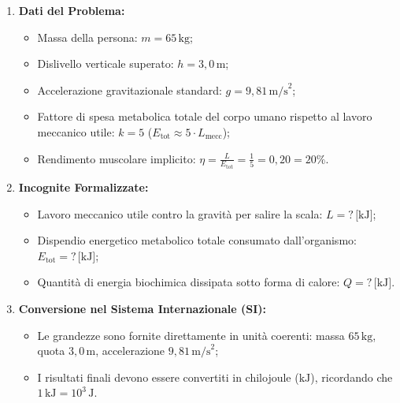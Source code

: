 \documentclass[11pt,a4paper,oneside]{report}
\begin{document}
\begin{problema}
\begin{enumerate}[label=\textbf{Fase \arabic*:}, leftmargin=*, itemsep=5pt]
  \item \textbf{Dati del Problema:}
  \begin{itemize}[leftmargin=*, label=\textbullet]
    \item Massa della persona: $m = 65\,\text{kg}$;
    \item Dislivello verticale superato: $h = 3{,}0\,\text{m}$;
    \item Accelerazione gravitazionale standard: $g = 9{,}81\,\text{m/s}^2$;
    \item Fattore di spesa metabolica totale del corpo umano rispetto al lavoro meccanico utile: $k = 5$ ($E_{\text{tot}} \approx 5 \cdot L_{\text{mecc}}$);
    \item Rendimento muscolare implicito: $\eta = \frac{L}{E_{\text{tot}}} = \frac{1}{5} = 0{,}20 = 20\%$.
  \end{itemize}

  \item \textbf{Incognite Formalizzate:}
  \begin{itemize}[leftmargin=*, label=\textbullet]
    \item Lavoro meccanico utile contro la gravit\`a per salire la scala: $L = ?\,\text{[kJ]}$;
    \item Dispendio energetico metabolico totale consumato dall'organismo: $E_{\text{tot}} = ?\,\text{[kJ]}$;
    \item Quantit\`a di energia biochimica dissipata sotto forma di calore: $Q = ?\,\text{[kJ]}$.
  \end{itemize}

  \item \textbf{Conversione nel Sistema Internazionale (SI):}
  \begin{itemize}[leftmargin=*, label=\textbullet]
    \item Le grandezze sono fornite direttamente in unit\`a coerenti: massa $65\,\text{kg}$, quota $3{,}0\,\text{m}$, accelerazione $9{,}81\,\text{m/s}^2$;
    \item I risultati finali devono essere convertiti in chilojoule ($\text{kJ}$), ricordando che $1\,\text{kJ} = 10^3\,\text{J}$.
  \end{itemize}


\end{enumerate}
\end{problema}
\end{document}
